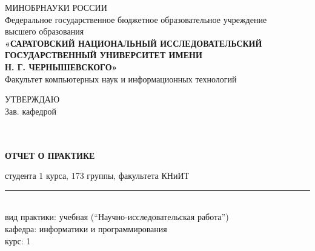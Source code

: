 \newcommand{\StudentCourse}{1}
\newcommand{\StudentGroup}{173}
\newcommand{\StudentFIO}{\rule{94mm}{0.4pt}}
\newcommand{\DepartmentName}{информатики и программирования}
\newcommand{\ChairHeadName}{\rule{49mm}{0.4pt}}
\newcommand{\PracticeDuration}{\rule{13mm}{0.4pt}}
\newcommand{\PracticeStart}{\rule{25mm}{0.4pt}}
\newcommand{\PracticeEnd}{\rule{25mm}{0.4pt}}
\newcommand{\SupervisorPosition}{\rule{30mm}{0.4pt}}
\newcommand{\SupervisorName}{\rule{34mm}{0.4pt}}
\begin{titlepage}
\thispagestyle{empty}
\begin{center}
МИНОБРНАУКИ РОССИИ\\[0.2em]
Федеральное государственное бюджетное образовательное учреждение\\
высшего образования\\
\textbf{«САРАТОВСКИЙ НАЦИОНАЛЬНЫЙ ИССЛЕДОВАТЕЛЬСКИЙ\\
ГОСУДАРСТВЕННЫЙ УНИВЕРСИТЕТ ИМЕНИ\\
Н. Г. ЧЕРНЫШЕВСКОГО»}\\
Факультет компьютерных наук и информационных технологий
\end{center}
\vspace{2mm}
\begin{flushright}
\begin{minipage}{61mm}
\raggedright
УТВЕРЖДАЮ\\
Зав. кафедрой\\[1mm]
\hrulefill\\[-0.6em]
\vspace{0mm}\hrulefill\\[-0.6em]
\end{minipage}
\end{flushright}
\vspace{4mm}
\begin{center}\textbf{ОТЧЕТ О ПРАКТИКЕ}\end{center}
\vspace{3mm}
\noindent студента \StudentCourse{} курса, \StudentGroup{} группы, факультета КНиИТ\\
\StudentFIO\\[8mm]
\noindent вид практики: учебная (``Научно-исследовательская работа'')\\
кафедра: \DepartmentName\\[2mm]
курс: \StudentCourse{}\\[2mm]

\end{titlepage}
